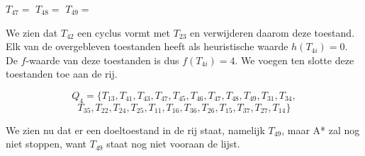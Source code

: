 \documentclass[alternative-exam.tex]{subfiles}
\begin{document}
\begin{center}
$T_{47} = $
$T_{48} = $
$T_{49} = $
\end{center}
We zien dat $T_{42}$ een cyclus vormt met $T_{23}$ en verwijderen daarom deze toestand. Elk van de overgebleven toestanden heeft als heuristische waarde $h(T_{4i}) = 0$. De $f$-waarde van deze toestanden is dus $f(T_{4i}) = 4$.
We voegen ten slotte deze toestanden toe aan de rij.
\begin{center}
\[
Q_4 = \{T_{13}, T_{41}, T_{43}, T_{47}, T_{45}, T_{46}, T_{47}, T_{48}, T_{49}, T_{31}, T_{34},
\]
\[
T_{35}, T_{22}, T_{24}, T_{25}, T_{11}, T_{16}, T_{36}, T_{26}, T_{15}, T_{37}, T_{27}, T_{14}\}
\]
\end{center}
We zien nu dat er een doeltoestand in de rij staat, namelijk $T_{49}$, maar A* zal nog niet stoppen, want $T_{49}$ staat nog niet vooraan de lijst.
\end{document}
